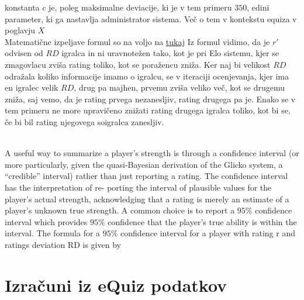 \documentclass{IEEEtran}
\begin{document}
konstanta $c$ je, poleg maksimalne deviacije, ki je v tem primeru $350$, edini parameter, ki ga nastavlja administrator sistema. Več o tem v kontekstu equiza v poglavju $X$ %
\hfill
\\
Matematične izpeljave formul so na voljo na \href{http://www.glicko.net/research/glicko.pdf}{tukaj} %
\newpage
Iz formul vidimo, da je $r'$ odvisen od $RD$ igralca in ni uravnotežen tako, kot je pri Elo sistemu, kjer se zmagovlacu zviša rating toliko, kot se poražencu zniža. Ker naj bi velikost $RD$ odražala koliko informacije imamo o igralcu, se v iteraciji ocenjevanja, kjer ima en igralec velik $RD$, drug pa majhen, prvemu zviša veliko več, kot se drugemu zniža, saj vemo, da je rating prvega nezanesljiv, rating drugega pa je. Enako se v tem primeru ne more upravičeno znižati rating drugega igralca toliko, kot bi se, če bi bil rating njegovega soigralca zanesljiv.

\hfill
\\
A useful way to summarize a player’s strength is through a confidence interval (or more particularly, given the quasi-Bayesian derivation of the Glicko system, a “credible” interval) rather than just reporting a rating. The confidence interval has the interpretation of re- porting the interval of plausible values for the player’s actual strength, acknowledging that a rating is merely an estimate of a player’s unknown true strength. A common choice is to report a $95\%$ confidence interval which provides $95\%$ confidence that the player’s true ability is within the interval. The formula for a $95\%$ confidence interval for a player with rating r and ratings deviation RD is given by

\hfill

\section{Izračuni iz eQuiz podatkov}
\label{sec:equiz}
\end{document}
